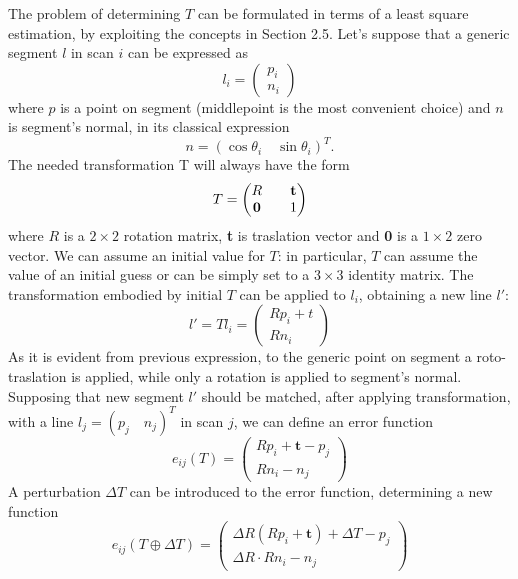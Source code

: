 \documentclass[a4paper, onecolumn]{report}
\begin{document}
The problem of determining $T$ can be formulated in terms of a least square estimation, by exploiting the concepts in Section 2.5. Let's suppose that a generic segment $l$ in scan $i$ can be expressed as 
\begin{equation}
	l_i = \left(\begin{matrix} p_i \\ n_i \end{matrix} \right)
\end{equation}
where $p$ is a point on segment (middlepoint is the most convenient choice) and $n$ is segment's normal, in its classical expression
\begin{equation}
	n = (\cos\theta_i \quad \sin\theta_i)^T.
\end{equation}
The needed transformation T will always have the form
\begin{equation}
	T = \left(\begin{matrix} R && \bf{t} \\ \bf{0} && 1 \end{matrix}\right)
\end{equation}
where $R$ is a $2\times2$ rotation matrix, \textbf{t} is traslation vector and \textbf{0} is a $1\times2$ zero vector. We can assume an initial value for $T$: in particular, $T$ can assume the value of an initial guess or can be simply set to a $3\times3$ identity matrix. The transformation embodied by initial $T$ can be applied to $l_i$, obtaining a new line $l'$:
\begin{equation}
	l' = Tl_i = \left(\begin{matrix}Rp_i+t \\ Rn_i\end{matrix}\right)
\end{equation}
As it is evident from previous expression, to the generic point on segment a roto-traslation is applied, while only a rotation is applied to segment's normal. Supposing that new segment $l'$ should be matched, after applying transformation, with a line $l_j = (p_j \quad n_j)^T$ in scan $j$, we can define an error function
\begin{equation}
	e_{ij}(T) = \left(\begin{matrix}Rp_i + \textbf{t} - p_j \\ Rn_i - n_j \end{matrix}\right)
\end{equation}
A perturbation $\Delta T$ can be introduced to the error function, determining a new function
\begin{equation}
	e_{ij}(T \oplus \Delta T) = \left(\begin{matrix} \Delta R(Rp_i + \textbf{t}) + \Delta T - p_j \\ \Delta R \cdot Rn_i - n_j \end{matrix}\right)
\end{equation}
\end{document}
